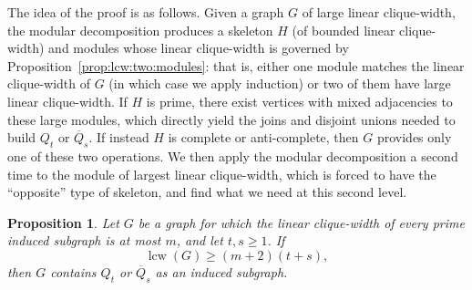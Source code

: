 \documentclass[10pt]{article}
\newcommand{\lcw}{\operatorname{lcw}}
\theoremstyle{plain}
\newtheorem{proposition}[theorem]{Proposition}
\begin{document}
The idea of the proof is as follows. Given a graph $G$ of large linear clique-width, the modular decomposition produces a skeleton $H$ (of bounded linear clique-width) and modules whose linear clique-width is governed by Proposition~\ref{prop:lcw:two:modules}: that is, either one module matches the linear clique-width of $G$ (in which case we apply induction) or two of them have large linear clique-width. If $H$ is prime, there exist vertices with mixed adjacencies to these large modules, which directly yield the joins and disjoint unions needed to build $Q_t$ or $\overline{Q}_s$. If instead $H$ is complete or anti-complete, then $G$ provides only one of these two operations. We then apply the modular decomposition a second time to the module of largest linear clique-width, which is forced to have the ``opposite'' type of skeleton, and find what we need at this second level.

\begin{proposition}
\label{prop:main}
Let $G$ be a graph for which the linear clique-width of every prime induced subgraph is at most $m$, and let $t,s\ge 1$. If
\[
	\lcw(G)\ge (m+2)(t+s),
\]
then $G$ contains $Q_t$ or $\overline{Q}_s$ as an induced subgraph.
\end{proposition}
\end{document}
